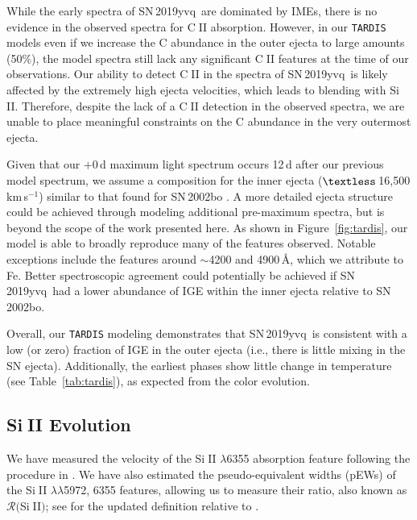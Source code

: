 \documentclass[twocolumn]{aastex63}
\def\ion#1#2{#1$\;${\footnotesize\rm{#2}}\relax}
\newcommand{\kms}{km\,s$^{-1}$}
\newcommand{\sn}{SN\,2019yvq}
\begin{document}
While the early spectra of \sn\ are dominated by IMEs, there is no evidence in
the observed spectra for \ion{C}{II} absorption. However, in our
\texttt{TARDIS} models even if we increase the C abundance in the outer ejecta
to large amounts (50\%), the model spectra still lack any significant
\ion{C}{II} features at the time of our observations. Our ability to detect
\ion{C}{II} in the spectra of \sn\ is likely affected by the extremely high
ejecta velocities, which leads to blending with \ion{Si}{II}. Therefore,
despite the lack of a \ion{C}{II} detection in the observed spectra, we are
unable to place meaningful constraints on the C abundance in the very
outermost ejecta.

Given that our $+0$\,d maximum light spectrum occurs 12\,d after our previous
model spectrum, we assume a composition for the inner ejecta
($\textless$\,16,500\,\kms) similar to that found for SN\,2002bo
\citep{Stehle05}. A more detailed ejecta structure could be achieved through
modeling additional pre-maximum spectra, but is beyond the scope of the work
presented here. As shown in Figure~\ref{fig:tardis}, our model is able to
broadly reproduce many of the features observed. Notable exceptions include
the features around $\sim$4200 and 4900\,\AA, which we attribute to Fe. Better
spectroscopic agreement could potentially be achieved if \sn\ had a lower
abundance of IGE within the inner ejecta relative to SN\,2002bo.

Overall, our \texttt{TARDIS} modeling demonstrates that \sn\ is consistent
with a low (or zero) fraction of IGE in the outer ejecta (i.e., there is
little mixing in the SN ejecta). Additionally, the earliest phases show little
change in temperature (see Table~\ref{tab:tardis}), as expected from the color
evolution.

\subsection{\ion{Si}{II} Evolution}\label{sec:SiII}

We have measured the velocity of the \ion{Si}{II} $\lambda$6355 absorption
feature following the procedure in \citet[][see their \S2.5]{Maguire14}. We
have also estimated the pseudo-equivalent widths (pEWs) of the \ion{Si}{II}
$\lambda\lambda$5972, 6355 features, allowing us to measure their ratio, also
known as $\mathcal{R}($\ion{Si}{II}$)$; see \citet{Hachinger08} for the
updated definition relative to \citet{Nugent95}.
\end{document}
